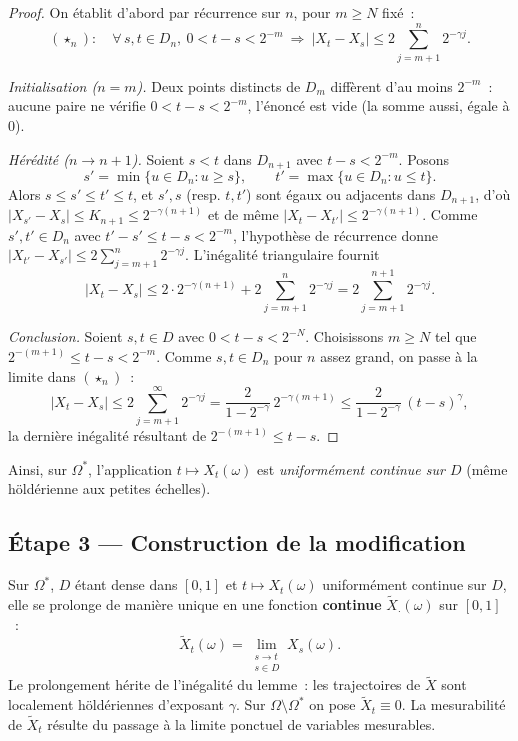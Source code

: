 \documentclass[11pt,a4paper]{article}
\theoremstyle{plain}
\theoremstyle{definition}
\newcommand{\abs}[1]{\left\lvert #1 \right\rvert}
\begin{document}
\begin{proof}
On \'etablit d'abord par r\'ecurrence sur $n$, pour $m\ge N$ fix\'e~:
\[
(\star_n):\quad\forall\,s,t\in D_n,\ 0<t-s<2^{-m}\ \Longrightarrow\ \abs{X_t-X_s}\le 2\sum_{j=m+1}^{n}2^{-\gamma j}.
\]

\emph{Initialisation ($n=m$).} Deux points distincts de $D_m$ diff\`erent d'au moins $2^{-m}$~: aucune paire ne v\'erifie $0<t-s<2^{-m}$, l'\'enonc\'e est vide (la somme aussi, \'egale \`a $0$).

\emph{H\'er\'edit\'e ($n\to n+1$).} Soient $s<t$ dans $D_{n+1}$ avec $t-s<2^{-m}$. Posons
\[
s'=\min\{u\in D_n:u\ge s\},\qquad t'=\max\{u\in D_n:u\le t\}.
\]
Alors $s\le s'\le t'\le t$, et $s',s$ (resp. $t,t'$) sont \'egaux ou adjacents dans $D_{n+1}$, d'o\`u $\abs{X_{s'}-X_s}\le K_{n+1}\le 2^{-\gamma(n+1)}$ et de m\^eme $\abs{X_t-X_{t'}}\le 2^{-\gamma(n+1)}$. Comme $s',t'\in D_n$ avec $t'-s'\le t-s<2^{-m}$, l'hypoth\`ese de r\'ecurrence donne $\abs{X_{t'}-X_{s'}}\le 2\sum_{j=m+1}^{n}2^{-\gamma j}$. L'in\'egalit\'e triangulaire fournit
\[
\abs{X_t-X_s}\le 2\cdot 2^{-\gamma(n+1)}+2\sum_{j=m+1}^{n}2^{-\gamma j}=2\sum_{j=m+1}^{n+1}2^{-\gamma j}.
\]

\emph{Conclusion.} Soient $s,t\in D$ avec $0<t-s<2^{-N}$. Choisissons $m\ge N$ tel que $2^{-(m+1)}\le t-s<2^{-m}$. Comme $s,t\in D_n$ pour $n$ assez grand, on passe \`a la limite dans $(\star_n)$~:
\[
\abs{X_t-X_s}\le 2\sum_{j=m+1}^{\infty}2^{-\gamma j}=\frac{2}{1-2^{-\gamma}}\,2^{-\gamma(m+1)}\le\frac{2}{1-2^{-\gamma}}\,(t-s)^{\gamma},
\]
la derni\`ere in\'egalit\'e r\'esultant de $2^{-(m+1)}\le t-s$.
\end{proof}

Ainsi, sur $\Omega^\ast$, l'application $t\mapsto X_t(\omega)$ est \emph{uniform\'ement continue sur $D$} (m\^eme h\"old\'erienne aux petites \'echelles).

\subsection*{\'Etape 3 — Construction de la modification}

Sur $\Omega^\ast$, $D$ \'etant dense dans $[0,1]$ et $t\mapsto X_t(\omega)$ uniform\'ement continue sur $D$, elle se prolonge de mani\`ere unique en une fonction \textbf{continue} $\tilde X_\cdot(\omega)$ sur $[0,1]$~:
\[
\tilde X_t(\omega)=\lim_{\substack{s\to t\\ s\in D}}X_s(\omega).
\]
Le prolongement h\'erite de l'in\'egalit\'e du lemme~: les trajectoires de $\tilde X$ sont localement h\"old\'eriennes d'exposant $\gamma$. Sur $\Omega\setminus\Omega^\ast$ on pose $\tilde X_t\equiv 0$. La mesurabilit\'e de $\tilde X_t$ r\'esulte du passage \`a la limite ponctuel de variables mesurables.
\end{document}
